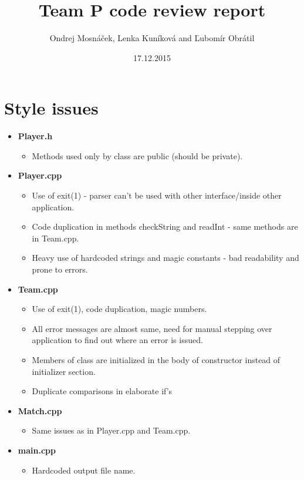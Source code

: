 \documentclass[10pt,a4paper]{article}
\author{Ondrej Mosnáček, Lenka Kuníková and Ľubomír Obrátil}
\title{Team P code review report}
\date{17.12.2015}
\begin{document}
\maketitle

\section*{Style issues}
\begin{itemize}
	\item \textbf{Player.h}
	\begin{itemize}
		\item Methods used only by class are public (should be private).
	\end{itemize}
	\item \textbf{Player.cpp}
	\begin{itemize}
		\item Use of exit(1) - parser can't be used with other interface/inside other application.
		\item Code duplication in methods checkString and readInt - same methods are in Team.cpp.
		\item Heavy use of hardcoded strings and magic constants - bad readability and prone to errors.
	\end{itemize}
	\item \textbf{Team.cpp}
	\begin{itemize}
		\item Use of exit(1), code duplication, magic numbers.
		\item All error messages are almost same, need for manual stepping over application to find out where an error is issued.
		\item Members of class are initialized in the body of constructor instead of initializer section.
		\item Duplicate comparisons in elaborate if's
	\end{itemize}
	\item \textbf{Match.cpp}
	\begin{itemize}
		\item Same issues as in Player.cpp and Team.cpp.
	\end{itemize}
	\item \textbf{main.cpp}
	\begin{itemize}
		\item Hardcoded output file name.
	\end{itemize}
\end{itemize}
\end{document}
